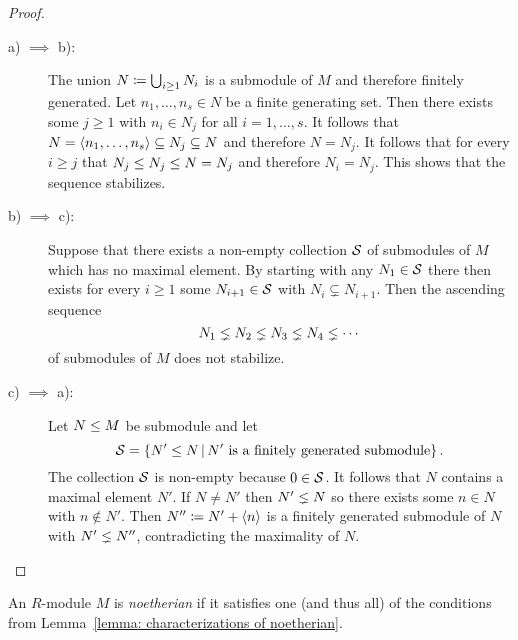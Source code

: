 \begin{proof}
  \leavevmode
  \begin{description}
    \item[a) $\implies$ b):]
      The union $N \coloneqq \bigcup_{i \geq 1} N_i$ is a submodule of $M$ and therefore finitely generated.
      Let $n_1, \dotsc, n_s \in N$ be a finite generating set.
      Then there exists some $j \geq 1$ with $n_i \in N_j$ for all $i = 1, \dotsc, s$.
      It follows that $N = \left\langle n_1, \dotsc, n_s \right\rangle \subseteq N_j \subseteq N$ and therefore $N = N_j$.
      It follows that for every $i \geq j$ that $N_j \leq N_j \leq N = N_j$ and therefore $N_i = N_j$.
      This shows that the sequence stabilizes.
    \item[b) $\implies$ c):]
      Suppose that there exists a non-empty collection $\mathcal{S}$ of submodules of $M$ which has no maximal element.
      By starting with any $N_1 \in \mathcal{S}$ there then exists for every $i \geq 1$ some $N_{i+1} \in \mathcal{S}$ with $N_i \subsetneq N_{i+1}$.
      Then the ascending sequence
      \[
                    N_1
        \lneq N_2
        \lneq N_3
        \lneq N_4
        \lneq \dotsb
      \]
      of submodules of $M$ does not stabilize.
    \item[c) $\implies$ a):]
      Let $N \leq M$ be submodule and let
      \[
          \mc{S}
        = \{
            N' \moduleleq N
          \suchthat
            \text{$N'$ is a finitely generated submodule}
          \} \,.
      \]
      The collection $\mathcal{S}$ is non-empty because $0 \in \mathcal{S}$.
      It follows that $N$ contains a maximal element $N'$.
      If $N \neq N'$ then $N' \lneq N$ so there exists some $n \in N$ with $n \notin N'$.
      Then $N'' \coloneqq N' + \left\langle n \right\rangle$ is a finitely generated submodule of $N$ with $N' \lneq N''$, contradicting the maximality of $N$.
    \qedhere
  \end{description}
\end{proof}


\begin{definition}
  An $R$-module $M$ is \emph{noetherian} if it satisfies one (and thus all) of the conditions from Lemma~\ref{lemma: characterizations of noetherian}.
\end{definition}


